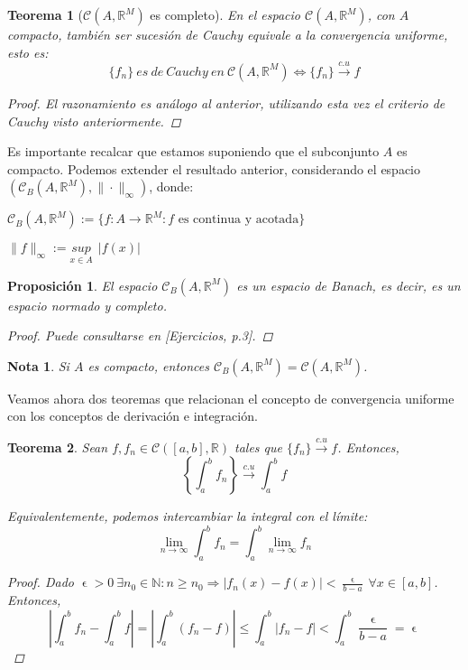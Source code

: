 \documentclass[11pt, a4paper]{article}
\let\epsilon\upvarepsilon
\newcommand{\R}{\mathbb{R}}
\newcommand{\fn}{\{f_n\}}
\theoremstyle{theorem-style}
\newtheorem{nth}{Teorema}[section]
\newtheorem{nprop}{Proposición}[section]
\theoremstyle{definition-style}
\theoremstyle{remark-style}
\newtheorem*{nota}{Nota}
\theoremstyle{example-style}
\begin{document}
\begin{nth}[$\mathcal{C}(A,\R^M)$ es completo] \label{3} En el espacio $\mathcal{C}(A,\mathbb{R}^M)$, con $A$ compacto, también ser sucesión de Cauchy equivale a la convergencia uniforme, esto es: $$\fn\ es\ de\ Cauchy\ en\ \mathcal{C}(A,\mathbb{R}^M) \iff \fn \xrightarrow {c.u} f $$

  \begin{proof} El razonamiento es análogo al anterior, utilizando esta vez el criterio de Cauchy visto anteriormente.
  \end{proof}
\end{nth}

Es importante recalcar que estamos suponiendo que el subconjunto $A$ es compacto. Podemos extender el resultado anterior, considerando el espacio $(\mathcal{C}_B(A,\mathbb{R}^M), \|\cdot\|_{\infty})$, donde: 

$\mathcal{C}_B(A,\mathbb{R}^M) := \{ f:A \longrightarrow \mathbb{R}^M: \text{$f$ es continua y acotada}\}$

$\|f\|_{\infty} := \underset{x \in A}{sup} \ \ |f(x)|$

\begin{nprop} El espacio $\mathcal{C}_B(A, \mathbb{R}^M)$ es un espacio de Banach, es decir, es un espacio normado y completo.

  \begin{proof}


    Puede consultarse en \textit{[Ejercicios, p.3]}.
  \end{proof}

\end{nprop}


\begin{nota}
  Si $A$ es compacto, entonces  $\mathcal{C}_B(A,\mathbb{R}^M) = \mathcal{C}(A, \mathbb{R}^M)$.
\end{nota}

Veamos ahora dos teoremas que relacionan el concepto de convergencia uniforme con los conceptos de derivación e integración.

\begin{nth} \label{4} Sean $f, f_n \in \mathcal{C}([a,b],\mathbb{R})$ tales que $\fn \xrightarrow {c.u} f$. Entonces, $$\left\{\int_a^b f_n\right\} \xrightarrow {c.u} \int_a^b f $$

  Equivalentemente, podemos intercambiar la integral con el límite: $$\lim_{n\rightarrow \infty} \int_a^b f_n = \int_a^b \lim_{n\rightarrow \infty} f_n$$

  \begin{proof} Dado $\displaystyle \epsilon >0\ \exists n_0 \in \mathbb{N}: n \ge n_0 \Rightarrow |f_n(x)-f(x)| < \frac{\epsilon}{b-a}\ \forall x \in [a,b]$. Entonces, $$\left| \int_a^b f_n - \int _a^b f \right| = \left| \int_a^b (f_n - f) \right| \le \int_a^b |f_n - f| < \int_a^b \frac{\epsilon}{b-a} = \epsilon$$
  \end{proof}
\end{nth}
\end{document}
